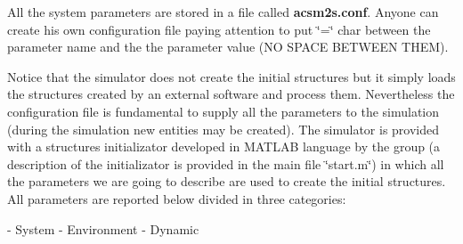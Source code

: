  All the system parameters are stored in a file called {\bfseries acsm2s.\-conf}. Anyone can create his own configuration file paying attention to put \char`\"{}=\char`\"{} char between the parameter name and the the parameter value (N\-O S\-P\-A\-C\-E B\-E\-T\-W\-E\-E\-N T\-H\-E\-M).\par
 Notice that the simulator does not create the initial structures but it simply loads the structures created by an external software and process them. Nevertheless the configuration file is fundamental to supply all the parameters to the simulation (during the simulation new entities may be created). The simulator is provided with a structures initializator developed in M\-A\-T\-L\-A\-B language by the group (a description of the initializator is provided in the main file \char`\"{}start.\-m\char`\"{}) in which all the parameters we are going to describe are used to create the initial structures. All parameters are reported below divided in three categories\-: \begin{DoxyVerb}          - System
          - Environment
          - Dynamic


\end{DoxyVerb}
